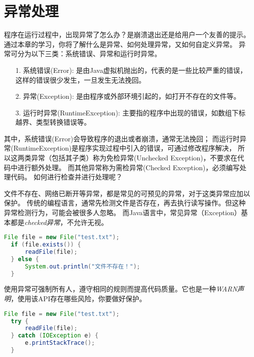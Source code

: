 \chapter{异常处理}
\label{chap:java_exception}

程序在运行过程中，出现异常了怎么办？是崩溃退出还是给用户一个友善的提示。
通过本章的学习，你将了解什么是异常、如何处理异常，又如何自定义异常。
异常可分为以下三类：系统错误、异常和运行时异常。

\begin{itemize}
\item[1.]系统错误(Error):\newline
是由Java虚拟机抛出的，代表的是一些比较严重的错误，这样的错误很少发生，一旦发生无法挽回。
\item[2.] 异常(Exception):\newline
是由程序或外部环境引起的，如打开不存在的文件等。
\item[3.] 运行时异常(RuntimeException):\newline
主要指的程序中出现的错误，如数组下标越界、类型转换错误等。
\end{itemize}

其中，系统错误(Error)会导致程序的退出或者崩溃，通常无法挽回；
而运行时异常(RuntimeException)是程序实现过程中引入的错误，可通过修改程序解决，
所以这两类异常（包括其子类）称为{\kaishu 免检异常}(Unchecked Exception)，不要求在代码中进行额外处理。
而其他异常称为{\kaishu 需检异常}(Checked Exception)，必须编写处理代码。
如何进行检查并进行处理呢？

文件不存在、网络已断开等异常，都是常见的可预见的异常，对于这类异常应加以保护。
传统的编程语言，通常先检测文件是否存在，再去执行读写操作。但这种异常检测行为，可能会被很多人忽略。
而Java语言中，常见异常（Exception）基本都是\emph{checked异常}，不允许无视。

\begin{lstlisting}[language=Java]
  File file = new File("test.txt");
  if (file.exists()) {
      readFile(file);
  } else {
      System.out.println("文件不存在！");
  }
\end{lstlisting}

使用异常可强制所有人，遵守相同的规则而提高代码质量。它也是一种\emph{WARN声明}，使用该API存在哪些风险，你要做好保护。
\begin{lstlisting}[language=Java]
  File file = new File("test.txt");
  try {
      readFile(file);
  } catch (IOException e) {
      e.printStackTrace();
  }
\end{lstlisting}

